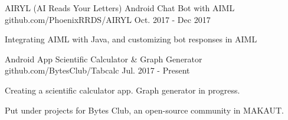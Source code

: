 


\begin{cventries}


\cventry
{AIRYL (AI Reads Your Letters)} %
{Android Chat Bot with AIML} %
{github.com/PhoenixRRDS/AIRYL} %
{Oct. 2017 - Dec 2017} %
{ %
\begin{cvitems}
\item {Integrating AIML with Java, and customizing bot responses in AIML}
\end{cvitems}
}


\cventry
{Android App} %
{Scientific Calculator \& Graph Generator} %
{github.com/BytesClub/Tabcalc} %
{Jul. 2017 - Present} %
{ %
\begin{cvitems}
\item {Creating a scientific calculator app. Graph generator in progress.}
\item {Put under projects for Bytes Club, an open-source community in MAKAUT.}
\end{cvitems}
}


\end{cventries}